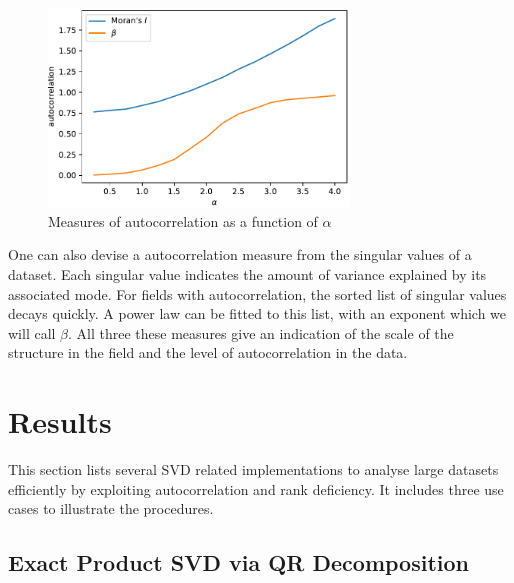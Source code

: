 \documentclass[ijgi,article,submit,moreauthors,pdftex,10pt,a4paper]{Definitions/mdpi}
\begin{document}
\begin{figure}[H]
\centering
\includegraphics[width=80mm]{Results/plotMoransIAndBeta.pdf}
\caption[Various measures of autocorrelation]{Measures of autocorrelation as a function of $\alpha$}
\label{fig:plotGammaAndMoransIAndBeta}
\end{figure}

One can also devise a autocorrelation measure from the singular values of a dataset. Each singular value indicates the amount of variance explained by its associated mode. For fields with autocorrelation, the sorted list of singular values decays quickly. A power law can be fitted to this list, with an exponent which we will call $\beta$. All three these measures give an indication of the scale of the structure in the field and the level of autocorrelation in the data.

\section{Results}


This section lists several SVD related implementations to analyse large datasets efficiently by exploiting autocorrelation and rank deficiency. It includes three use cases to illustrate the procedures.

\subsection{Exact Product SVD via QR Decomposition}
\label{sec:Results/Exact Product SVD via QR Decomposition}
\end{document}
